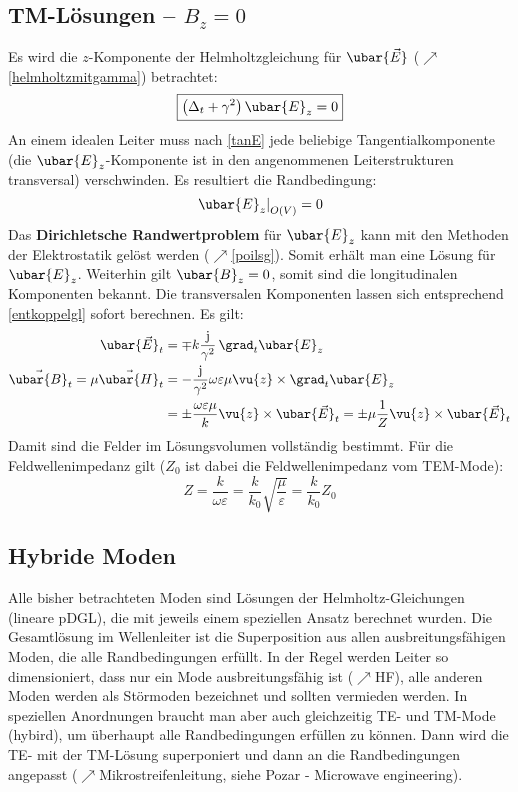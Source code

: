\subsection{TM-Lösungen -- $B_z=0$}
Es wird die \(z\)-Komponente der Helmholtzgleichung für \(\ubar{\vec{E}}\) ($\nearrow$\ref{helmholtzmitgamma}) betrachtet:
	\begin{equation}\label{TMGl}
		\boxed{\left(\Delta _t + \gamma^2\right) \ubar{E}_z =  0}
	\end{equation}
	 An einem idealen Leiter muss nach \ref{tanE} jede beliebige Tangentialkomponente (die \(\ubar{E}_z\)-Komponente ist in den angenommenen Leiterstrukturen transversal) verschwinden. Es resultiert die Randbedingung:
	 \begin{equation}
	 	\left. \ubar{E}_z\right|_{O(V)} = 0
	 \end{equation}
	 Das \textbf{Dirichletsche Randwertproblem} für \(\ubar{E}_z\)  kann mit den Methoden der Elektrostatik gelöst werden ($\nearrow$\ref{poilsg}). Somit erhält man eine Lösung für \(\ubar{E}_z\). Weiterhin gilt \(\ubar{B}_z=0\), somit sind die longitudinalen Komponenten bekannt. Die transversalen Komponenten lassen sich entsprechend \ref{entkoppelgl} sofort berechnen. Es gilt:
	\begin{equation}\begin{split}
		\ubar{\vec{E}}_t &=  \mp  k \frac{\mathrm{j}}{\gamma^2} \, \grad _t \ubar{E}_{z} \\
			\vec{\ubar{B}}_t = \mu\vec{\ubar{H}}_t&= -\frac{\mathrm{j}}{\gamma^2} \omega\varepsilon\mu  \vu{z}\times\grad _t \ubar{E}_{z}\\
			&= \pm \frac{\omega\varepsilon\mu}{ k} \vu{z}\times \ubar{\vec{E}}_{t} = \pm \mu \frac{1}{Z} \vu{z}\times \ubar{\vec{E}}_{t}  
	\end{split}\end{equation}
	 Damit sind die Felder im Lösungsvolumen vollständig bestimmt. Für die Feldwellenimpedanz gilt ($Z_0$ ist dabei die Feldwellenimpedanz vom TEM-Mode):
	 \begin{equation}
	 	\boxed{Z=\frac{ k}{\omega\varepsilon} = \frac{ k}{ k_0}\sqrt{\frac{\mu}{\varepsilon}} = \frac{ k}{ k_0} Z_0}
	 \end{equation}
	 \subsection{Hybride Moden}
	 Alle bisher betrachteten Moden sind Lösungen der Helmholtz-Gleichungen (lineare pDGL), die mit jeweils einem speziellen Ansatz berechnet wurden. Die Gesamtlösung im Wellenleiter ist die Superposition aus allen ausbreitungsfähigen Moden, die alle Randbedingungen erfüllt. In der Regel werden Leiter so dimensioniert, dass nur ein Mode ausbreitungsfähig ist ($\nearrow$HF), alle anderen Moden werden als Störmoden bezeichnet und sollten vermieden werden. In speziellen Anordnungen braucht man aber auch gleichzeitig TE- und TM-Mode (hybird), um überhaupt alle Randbedingungen erfüllen zu können. Dann wird die TE- mit der TM-Lösung superponiert und dann an die Randbedingungen angepasst ($\nearrow$Mikrostreifenleitung, siehe Pozar - Microwave engineering).
